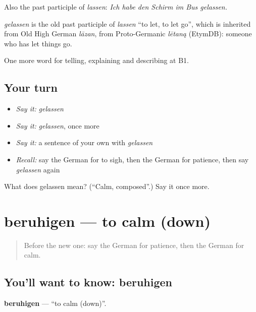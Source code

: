 Also the past participle of \emph{lassen}: \emph{Ich habe den Schirm im Bus gelassen.}

\begin{cousinweb}
\emph{gelassen} is the old past participle of \emph{lassen} \textquotedblleft{}to let, to let go\textquotedblright{}, which is inherited from Old High German \emph{lāzan}, from Proto-Germanic \emph{lētaną} (EtymDB): someone who has let things go.
\end{cousinweb}

\begin{grammarlens}[title={What you've built}]
One more word for telling, explaining and describing at B1.
\end{grammarlens}

\subsection*{Your turn}
\begin{itemize}
\raggedright
  \item \emph{Say it:} \emph{gelassen}
  \item \emph{Say it:} \emph{gelassen}, once more
  \item \emph{Say it:} a sentence of your own with \emph{gelassen}
  \item \emph{Recall:} say the German for to sigh, then the German for patience, then say \emph{gelassen} again
\end{itemize}

\begin{tcolorbox}[breakable,colback=teal!4,colframe=teal!35!black,title={Before you move on}]
What does gelassen mean? (\textquotedblleft{}Calm, composed\textquotedblright{}.) Say it once more.
\end{tcolorbox}
\section[beruhigen]{beruhigen — to calm (down)}

\label{lesson:GE-C470-beruhigen}



\begin{quote}
Before the new one: say the German for patience, then the German for calm.
\end{quote}

\subsection*{You'll want to know: beruhigen}
\textbf{beruhigen} — \textquotedblleft{}to calm (down)\textquotedblright{}.

